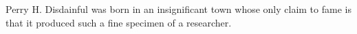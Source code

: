 \begin{vita}
Perry H. Disdainful was born in an insignificant town
whose only claim to fame is that it produced such a fine
specimen of a researcher.
\end{vita}